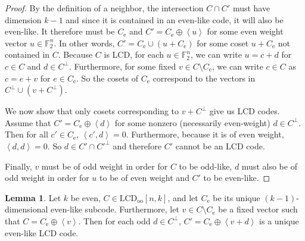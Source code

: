 \documentclass[11pt]{article}
\theoremstyle{definition}
\newtheorem{lemma}[theorem]{Lemma}
\newcommand{\F}{\mathbb{F}}
\newcommand{\Ang}[1]{\left\langle#1\right\rangle}
\newcommand{\LCDoo}[2]{\mathrm{LCD}_{\mathrm{oo}} [#1, #2]}
\newcommand{\CodeCe}{C_{\mathrm{e}}}
\begin{document}
\begin{proof}
	By the definition of a neighbor, the intersection $C \cap C'$ must have dimension $k - 1$ and since it is contained in an even-like code, it will also be even-like.
	It therefore must be $\CodeCe$ and $C' = \CodeCe \oplus \Ang{u}$ for some even weight vector $u \in \F_2^n$.
	In other words, $C' = \CodeCe \cup (u + \CodeCe)$ for some coset $u + \CodeCe$ not contained in $C$.
	Because $C$ is LCD, for each $u \in \F_2^n$, we can write $u = c + d$ for $c \in C$ and $d \in C^{\perp}$.
	Furthermore, for some fixed $v \in C \setminus \CodeCe$, we can write $c \in C$ as $c = e + v$ for $e \in \CodeCe$.
	So the cosets of $\CodeCe$ correspond to the vectors in $C^{\perp} \cup (v + C^{\perp})$.

	We now show that only cosets corresponding to $v + C^{\perp}$ give us LCD codes.
	Assume that $C' = \CodeCe \oplus \Ang{d}$ for some nonzero (necessarily even-weight) $d \in C^{\perp}$.
	Then for all $c' \in \CodeCe$, $\Ang{c', d} = 0$.
	Furthermore, because it is of even weight, $\Ang{d, d} = 0$.
	So $d \in C' \cap C'^{\perp}$ and therefore $C'$ cannot be an LCD code.

	Finally, $v$ must be of odd weight in order for $C$ to be odd-like, $d$ must also be of odd weight in order for $u$ to be of even weight and $C'$ to be even-like.
\end{proof}

\begin{lemma}\label{lem:ooeo-suf}
	Let $k$ be even, $C \in \LCDoo{n}{k}$, and let $\CodeCe$ be its unique $(k - 1)$-dimensional even-like subcode. Furthermore, let $v \in C \setminus \CodeCe$ be a fixed vector such that $C = \CodeCe \oplus \Ang{v}$.
	Then for each odd $d \in C^{\perp}$, $C' = \CodeCe \oplus \Ang{v + d}$ is a unique even-like LCD code.
\end{lemma}
\end{document}
